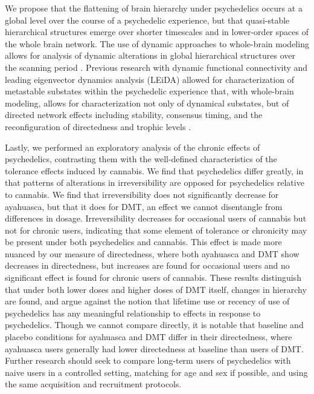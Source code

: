 We propose that the flattening of brain hierarchy under psychedelics occurs at a global level over the course
of a psychedelic experience, but that quasi-stable hierarchical structures emerge over shorter timescales and
in lower-order spaces of the whole brain network. The use
of dynamic approaches to whole-brain modeling allows for analysis of dynamic alterations in global hierarchical
structures over the scanning period \parencite{Bahrami2022,Deco2014}. Previous research with dynamic functional connectivity and leading
eigenvector dynamics analysis (LEiDA) allowed for characterization of metastable substates within the psychedelic
experience that, with whole-brain modeling, allows for characterization not only of dynamical substates, but of directed network effects including stability, consensus timing, and the reconfiguration of directedness and 
trophic levels \parencite{Lord2019,Cabral2017}.

Lastly, we performed an exploratory analysis of the chronic effects of psychedelics, contrasting them with
the well-defined characteristics of the tolerance effects induced by cannabis. We find that psychedelics
differ greatly, in that patterns of alterations in irreversibility are opposed for psychedelics relative
to cannabis. We find that irreversibility does not significantly decrease for ayahuasca,
but that it does for DMT, an effect we cannot disentangle from differences in dosage. Irreversibility decreases for occasional users of cannabis but not for chronic users, indicating
that some element of tolerance or chronicity may be present under both psychedelics and cannabis.
This effect is made more nuanced by our measure of directedness, where both ayahuasca
and DMT show decreases in directedness, but increases are found for occasional users and
no significant effect is found for chronic users of cannabis. These results distinguish
that under both lower doses and higher doses of DMT itself, changes in hierarchy are found,
and argue against the notion that lifetime use or recency of use of psychedelics has
any meaningful relationship to effects in response to psychedelics. Though we cannot
compare directly, it is notable that baseline and placebo conditions for ayahuasca and DMT
differ in their directedness, where ayahuasca users generally had lower directedness
at baseline than users of DMT. Further research should seek to compare long-term users
of psychedelics with naive users in a controlled setting, matching for age and sex if possible,
and using the same acquisition and recruitment protocols. 

